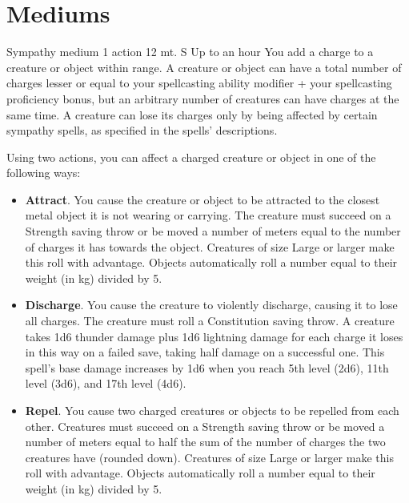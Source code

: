 \section{Mediums} \label{sec::mediums}
    {Sympathy medium}
    {1 action}
    {12 mt.}
    {S}
    {Up to an hour}
    You add a charge to a creature or object within range.
    A creature or object can have a total number of charges lesser or equal to your spellcasting ability modifier + your spellcasting proficiency bonus, but an arbitrary number of creatures can have charges at the same time.
    A creature can lose its charges only by being affected by certain sympathy spells, as specified in the spells' descriptions.

    Using two actions, you can affect a charged creature or object in one of the following ways:
    \begin{itemize}
        \item \textbf{Attract}.
        You cause the creature or object to be attracted to the closest metal object it is not wearing or carrying.
        The creature must succeed on a Strength saving throw or be moved a number of meters equal to the number of charges it has towards the object.
        Creatures of size Large or larger make this roll with advantage.
        Objects automatically roll a number equal to their weight (in kg) divided by 5.
        \item \textbf{Discharge}.
        You cause the creature to violently discharge, causing it to lose all charges.
        The creature must roll a Constitution saving throw.
        A creature takes 1d6 thunder damage plus 1d6 lightning damage for each charge it loses in this way on a failed save, taking half damage on a successful one.
        This spell's base damage increases by 1d6 when you reach 5th level (2d6), 11th level (3d6), and 17th level (4d6).
        \item \textbf{Repel}.
        You cause two charged creatures or objects to be repelled from each other.
        Creatures must succeed on a Strength saving throw or be moved a number of meters equal to half the sum of the number of charges the two creatures have (rounded down).
        Creatures of size Large or larger make this roll with advantage.
        Objects automatically roll a number equal to their weight (in kg) divided by 5.
    \end{itemize}
